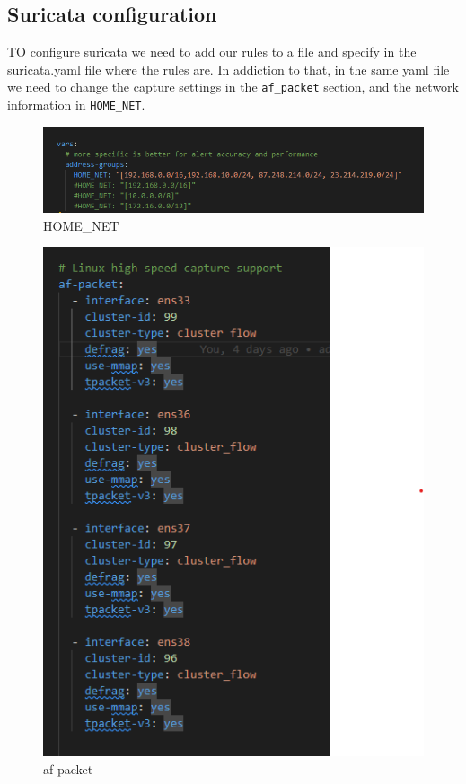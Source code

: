 \documentclass{article}
\begin{document}
\subsection{Suricata configuration}
\quad TO configure suricata we need to add our rules to a file and specify in the suricata.yaml file where the rules are. In addiction to that, in the same yaml file we need to change the capture settings in the \texttt{af_packet} section, and the network information in \texttt{HOME_NET}.



\texttt{}\par
\begin{figure}[H]
    \centering
    \includegraphics[scale=0.5]{suricata/config_home_net.png}
    \caption{HOME_NET}
    \label{fig:network-arc}
\end{figure}

\texttt{}\par
\begin{figure}[H]
    \centering
    \includegraphics[scale=0.5]{suricata/config_af_packet.png}
    \caption{af-packet}
    \label{fig:network-arc}
\end{figure}
\end{document}
